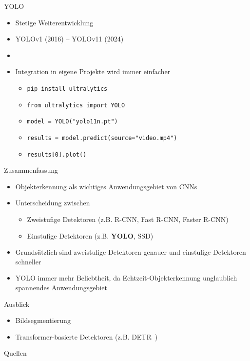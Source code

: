 \documentclass{beamer}
\begin{document}
\begin{frame}{YOLO}
    \begin{itemize}
        \item Stetige Weiterentwicklung
        \item YOLOv1 (2016) -- YOLOv11 (2024)
        \item[]
        \item<2-> Integration in eigene Projekte wird immer einfacher~\cite{ultralytics2025yolo}
              \begin{itemize}
                  \item \texttt{pip install ultralytics}
                  \item \texttt{from ultralytics import YOLO}
                  \item \texttt{model = YOLO("yolo11n.pt")}
                  \item \texttt{results = model.predict(source="video.mp4")}
                  \item \texttt{results[0].plot()}
              \end{itemize}
    \end{itemize}
\end{frame}

\begin{frame}{Zusammenfassung}
    \begin{itemize}
        \item<1-> Objekterkennung als wichtiges Anwendungsgebiet von CNNs
        \item<2-> Unterscheidung zwischen
              \begin{itemize}
                  \item Zweistufige Detektoren (z.B. R-CNN, Fast R-CNN, Faster R-CNN)
                  \item Einstufige Detektoren (z.B. \textbf{YOLO}, SSD)
              \end{itemize}
        \item<3-> Grundsätzlich sind zweistufige Detektoren genauer und einstufige Detektoren schneller
        \item<4-> YOLO immer mehr Beliebtheit, da Echtzeit-Objekterkennung unglaublich spannendes Anwendungsgebiet
    \end{itemize}
\end{frame}

\begin{frame}{Ausblick}
    \begin{itemize}
        \item Bildsegmentierung
        \item Transformer-basierte Detektoren (z.B. DETR~\cite{carion2020end})
    \end{itemize}
\end{frame}

\begin{frame}{Quellen}
    \sloppy
    \printbibliography
\end{frame}
\end{document}
